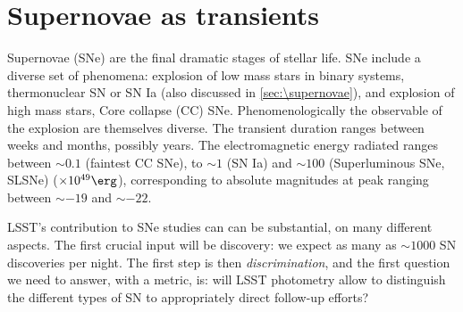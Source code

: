 %
%
%
%
%
%
%
%

\section{Supernovae as transients}
\def\secname{SNtransients}\label{sec:\secname} %


Supernovae (SNe) are the final dramatic stages of stellar life. SNe include a diverse set of phenomena: explosion of low mass stars in binary systems, thermonuclear SN or SN Ia (also discussed in \ref{sec:\supernovae}), and explosion of high mass stars, Core collapse (CC) SNe. Phenomenologically the observable of the explosion are themselves diverse.  The transient duration ranges between weeks and months, possibly years. The electromagnetic energy radiated ranges between $\sim0.1$ (faintest CC SNe), to $\sim1$ (SN Ia) and $\sim100$ (Superluminous SNe, SLSNe) ($\times 10^{49} \erg$), corresponding to absolute magnitudes at peak ranging between $\sim-19$ and $\sim-22$.

LSST's contribution to SNe studies can can be substantial, on many different aspects. The first crucial input will be discovery: we expect as many as $\sim 1000$ SN discoveries per night. The first step is then \emph{discrimination}, and the first question we need to answer, with a metric, is: will LSST photometry allow to distinguish the different types of SN to appropriately direct follow-up efforts?

